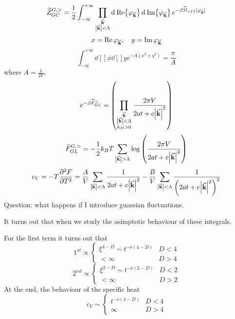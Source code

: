 \documentclass[../main/main.tex]{subfiles}
\begin{document}
\begin{equation}
  \widetilde{Z}_{GC}^{G,>} = \frac{1}{2} \int_{- \infty }^{+ \infty } \prod_{\substack{ \va{k}   \\\abs{\va{k}} < \Lambda } }^{} \dd[]{\Re {\varphi _{\va{k}}}}  \dd[]{\Im {\varphi _{\va{k}}}}
  e^{- \beta \widetilde{\mathcal{H}}_{eff} [\varphi _{\va{k}}] }
\end{equation}
\begin{equation}
  x = \Re \varphi _{\va{k}}, \quad   y = \Im \varphi _{\va{k}}
\end{equation}
\begin{equation}
  \int_{-\infty }^{+\infty } \dd[]{x} \dd[]{y} e^{-A (x^2+y^2)} = \frac{\pi }{A}
\end{equation}
where \( A= \frac{1}{2V} \).
\begin{equation}
  e^{-\beta \widetilde{F}_{GL}^> } = \qty(\prod_{\substack{\va{k} \\ \abs{\va{k}} <\Lambda \\ k_D > 0  } }^{}  \frac{2 \pi V}{2 a t + c \abs{\va{k}}^2 } )
\end{equation}
\begin{equation}
  \widetilde{F}_{GL}^{G,>} = - \frac{1}{2} k_B T \sum_{\abs{\va{k}}> \Lambda  }^{}
  \log{\qty(\frac{2 \pi V}{2 a t + c \abs{\va{k}}^2 })}
\end{equation}
\begin{equation}
  c_V = - T \pdv[2]{F}{T} = \frac{A}{V} \sum_{\abs{\va{k}} < \Lambda  }^{}
  \frac{1}{2 a t + c \abs{\va{k}}^2 } - \frac{B}{V} \sum_{\abs{\va{k}}< \Lambda  }^{} \frac{1}{\qty(2 a t + c \abs{\va{k}}^2)^2 }
\end{equation}
Question: what happens if I introduce guassian fluctuations.

It turns out that when we study the asimptotic behaviour of these integrals.

For the first term it turns out that
\begin{equation}
1^{st} \propto
  \begin{cases}
   \xi ^{4-D} \sim t^{-\nu (4-D)}  & D < 4\\
  < \infty & D > 4
  \end{cases}
\end{equation}
\begin{equation}
2^{nd} \propto
  \begin{cases}
   \xi ^{2-D} \sim t^{-\nu (2-D)}  & D < 2\\
  < \infty & D > 2
  \end{cases}
\end{equation}
At the end, the behaviour of the specific heat
\begin{equation}
  c_V \sim \begin{cases}
    t^{-\nu (4-D)} & D < 4 \\
    \infty & D > 4
\end{cases}
\end{equation}
\end{document}
